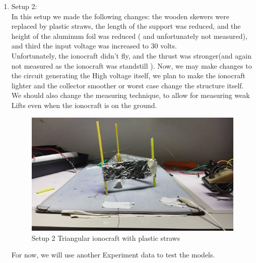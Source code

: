 \begin{enumerate}
	\item Setup 2:\\
	In this setup we made the following changes: the wooden
	skewers were replaced by plastic straws, the length
	of the support was reduced, and the height of the aluminum foil
	was reduced ( and unfortunately not measured), and third the input
	voltage was increased to 30 volts.\\
	Unfortunately, the ionocraft didn't fly, and the thrust was
	stronger(and again not measured as the ionocraft was standstill
	).
	\newpage
	Now, we may make changes to the circuit generating the High
	voltage itself, we plan to make the ionocraft lighter
	and the collector smoother
	or worst case change the structure itself.
	We should also change the measuring technique, to allow for
	measuring weak Lifts even when the ionocraft is on the ground.
	\begin{figure}[ht]
		\centering
		\includegraphics[scale =0.27]{images/results images/setup2.jpeg}
		\caption{Setup 2 Triangular ionocraft with plastic straws}
	\end{figure}

	For now, we will use another Experiment data to test the models.
\end{enumerate}


